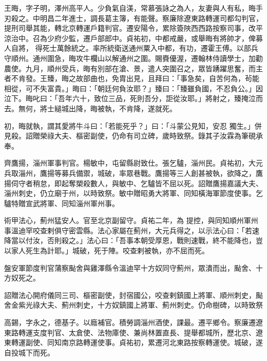 \begin{pinyinscope}
 王晦，字子明，澤州高平人。少負氣自渼，常慕張詠之為人，友妻與人有私，晦手刃殺之。中明昌二年進士，調長葛主簿，有能聲。察廉除遼東路轉運司都勾判官，提刑司舉其能，轉北京轉運戶籍判官。遷安陽令，累除簽陜西西路按察司事，改平涼治中。召為少府少監，遷戶部郎中。貞祐初，中都戒嚴，或舉晦有將帥才，俾募人自將，
 得死士萬餘統之。率所統衛送通州粟入中都，有功，遷霍王傅。以部兵守順州。通州圍急，晦攻牛欄山以解通州之圍。賜賚優渥，遷翰林侍讀學士，加勸農使。九月，順州受兵，晦有別部在滄、景，遣人突圍召之，眾皆踴躍思奮，而主者不肯發。王臻，晦之故部曲也，免胄出見，且拜曰：「事急矣，自苦何為，茍能相從，可不失富貴。」晦曰：「朝廷何負汝耶？」臻曰：「臻雖負國，不忍負公。」因泣下。晦叱曰：「吾年六十，致位三品，死則吾分，詎從汝耶。」將射之，臻掩泣而去。無何，將士縋城出降，晦被執，不肯降，遂就死。



 初，晦就執，謂其愛將牛斗曰：「若能死乎？」曰：「斗蒙公見知，安忍
 獨生。」併見殺。詔贈榮祿大夫、樞密副使，仍命有司立碑，歲時致祭。錄其子汝霖為筆硯承奉。



 齊鷹揚，淄州軍事判官。楊敏中，屯留縣尉致仕。張乞驢，淄州民。貞祐初，大元兵取淄州，鷹揚等募兵備禦，城破，率眾巷戰。鷹揚等三人創甚被執，欲降之，鷹揚伺守者稍怠，即起奪槊殺數人，與敏中、乞驢皆不屈以死。詔贈鷹揚嘉議大夫、淄州刺史，仍立廟于州，以時致祭。敏中贈昭勇大將軍、同知橫海軍節度使事。乞驢特贈宣武將軍、同知淄州軍州事。



 術甲法心，薊州猛安人。官至北京副留守。貞祐二年，為
 提控，與同知順州軍州事溫迪罕咬查剌俱守密雲縣。法心家屬在薊州，大元兵得之，以示法心曰：「若速降當以付汝，否則殺之。」法心曰：「吾事本朝受厚恩，戰則速戰，終不能降也，豈以家人死生為計耶。」城破，死于陣。咬查剌被執，亦不屈而死。



 盤安軍節度判官蒲察颭舍與雞澤縣令溫迪罕十方奴同守薊州，眾潰而出，颭舍、十方奴死之。



 詔贈法心開府儀同三司、樞密副使，封宿國公，咬查剌鎮國上將軍、順州刺史，颭舍金紫光祿大夫、薊州刺史，十方奴鎮國上將軍、薊州刺史。仍命樹碑，以時致祭



 高錫，字永之，德基子。以廕補官。積勞調淄州酒使，課最。遷平鄉令。察廉遷遼東路轉運支度判官、太倉使、法物庫使、兼尚林置直長、提舉都城所，歷北京、遼東轉運副使、同知南京路轉運使事。貞祐初，累遷河北東路按察轉運使。城破，遂自投城下而死。



\end{pinyinscope}
